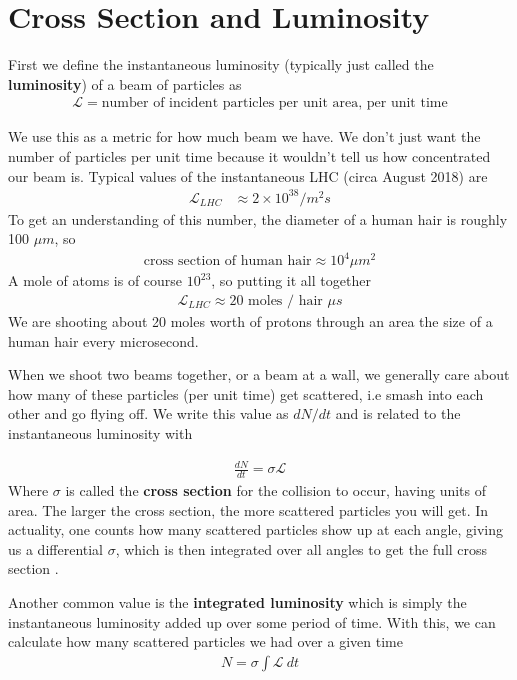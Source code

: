 \section{Cross Section and Luminosity}
First we define the instantaneous luminosity (typically just called the \textbf{luminosity}) of a beam of particles as \cite{cousins}
\begin{align}
\mathcal{L} = \textrm{number~of~incident~particles~per~unit~area,~per~unit~time}
\end{align}

We use this as a metric for how much beam we have. We don't just want the number of particles per unit time because it wouldn't tell us how concentrated our beam is.  Typical values of the instantaneous LHC (circa August 2018) are
\begin{align}
\mathcal{L}_{LHC} &\approx 2\times 10^{38} /m^2s
\end{align}
To get an understanding of this number, the diameter of a human hair is roughly  100 $\mu m$, so
\begin{align}
\textrm{cross section of human hair} \approx   10^4 \mu m^2
\end{align}
A mole of atoms is of course $10^{23}$, so putting it all together
\begin{align}
\mathcal{L}_{LHC} \approx 20 \textrm{~moles / hair~} \mu s
\end{align}
We are shooting about 20 moles worth of protons through an area the size of a human hair every microsecond.

When we shoot two beams together, or a beam at a wall, we generally care about how many of these particles (per unit time) get scattered, i.e smash into each other and go flying off. We write this value as $dN/dt$ and is related to the instantaneous luminosity with

\begin{align}
\frac{dN}{dt} = \sigma\mathcal{L}
\end{align}
Where $\sigma$ is called the \textbf{cross section} for the collision to occur, having units of area. The larger the cross section, the more scattered particles you will get. In actuality, one counts how many scattered particles show up at each angle, giving us a differential $\sigma$, which is then integrated over all angles to get the full cross section \cite{griffiths_qm}.


Another common value is the \textbf{integrated luminosity} which is simply the instantaneous luminosity added up over some period of time. With this, we can calculate how many scattered particles we had over a given time
\begin{align}
N = \sigma \int \mathcal{L}~dt
\end{align}

